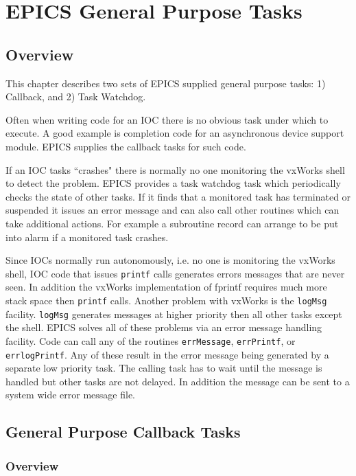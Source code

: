 \chapter{EPICS General Purpose Tasks}

\section{Overview}

This chapter describes two sets of EPICS supplied general purpose tasks: 1) Callback,  and 2) Task Watchdog.

Often when writing code for an IOC there is no obvious task under which to execute. A good example is completion code 
for an asynchronous device support module. EPICS supplies the callback tasks for such code.

If an IOC tasks ``crashes" there is normally no one monitoring the vxWorks shell to detect the problem. EPICS provides a 
task watchdog task which periodically checks the state of other tasks. If  it finds that a monitored task has terminated or 
suspended it issues an error message and can also call other routines which can take additional actions. For example a 
subroutine record can arrange to be put into alarm if a monitored task crashes.

Since IOCs normally run autonomously, i.e. no one is monitoring the vxWorks shell, IOC code that issues \verb|printf| calls 
generates errors messages that are never seen. In addition the vxWorks implementation of fprintf requires much more 
stack space then \verb|printf| calls. Another problem with vxWorks is the \verb|logMsg| facility. \verb|logMsg| generates messages at 
higher priority then all other tasks except the shell. EPICS solves all of these problems via an error message handling 
facility. Code can call any of the routines \verb|errMessage|, \verb|errPrintf|, or \verb|errlogPrintf|. Any of these result in the 
error message being generated by a separate low priority task. The calling task has to wait until the message is handled but 
other tasks are not delayed. In addition the message can be sent to a system wide error message file.

\section{General Purpose Callback Tasks}

\subsection{Overview}

